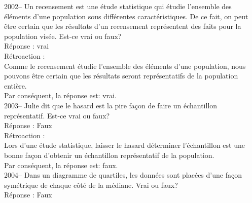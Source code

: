 \documentclass[letterpaper, 12pt]{article}
\begin{document}

2002-- Un recensement est une \'etude statistique qui \'etudie l'ensemble des \'el\'ements d'une population sous diff\'erentes caract\'eristiques. De ce fait, on peut \^etre certain que les r\'esultats d'un recensement repr\'esentent des faits pour la population vis\'ee. Est-ce vrai ou faux?\\

R\'eponse : vrai\\

R\'etroaction :\\
Comme le recensement \'etudie l'ensemble des \'el\'ements d'une population, nous pouvons \^etre certain que les r\'esultats seront repr\'esentatifs de la population enti\`ere.\\
Par cons\'equent, la r\'eponse est: vrai.\\

2003-- Julie dit que le hasard est la pire fa\c con de faire un \'echantillon repr\'esentatif. Est-ce vrai ou faux?\\

R\'eponse : Faux\\

R\'etroaction :\\
Lors d'une \'etude statistique, laisser le hasard d\'eterminer l'\'echantillon est une bonne fa\c con d'obtenir un \'echantillon repr\'esentatif de la population. \\
Par cons\'equent, la r\'eponse est: faux.\\


2004-- Dans un diagramme de quartiles, les donn\'ees sont plac\'ees d'une fa\c con sym\'etrique de chaque c\^ot\'e de la m\'ediane. Vrai ou faux?\\

R\'eponse : Faux\\
\end{document}
